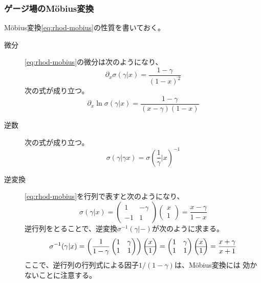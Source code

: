 \subsubsection{ゲージ場のM\"obius変換}\label{s3:ゲージ場のMobius変換} %
M\"obius変換\eqref{eq:rhod-mobius}の性質を書いておく。
\begin{description} %
	\item[微分]	\eqref{eq:rhod-mobius}の微分は次のようになり、
	\begin{equation*}
		\partial_x\sigma(\gamma|x) = \frac{1 - \gamma}{(1 - x)^2}
	\end{equation*}
	次の式が成り立つ。
	\begin{equation}\label{eq:rhod-mobius-diff}
		\partial_x\ln\sigma(\gamma|x) = \frac{1 - \gamma}{(x - \gamma)(1 - x)}
	\end{equation}
	\item[逆数] 次の式が成り立つ。
	\begin{equation}\label{eq:rhod-mobius-rec}
		\sigma(\gamma|\gamma x) = \sigma(\frac{1}{\gamma}|x)^{-1}
	\end{equation}
	\item[逆変換] \eqref{eq:rhod-mobius}を行列で表すと次のようになり、
	\begin{equation*}
		\sigma(\gamma|x) = \begin{pmatrix}
			1 & -\gamma \\ -1 & 1
		\end{pmatrix}\begin{pmatrix}
			x \\\hline 1
		\end{pmatrix} = \frac{x - \gamma}{1 - x}
	\end{equation*}
	逆行列をとることで、逆変換$\sigma^{-1}(\gamma|-)$が次のように求まる。
	\begin{equation*}
		\sigma^{-1}(\gamma|x) = \mathinner{\left({\frac{1}{1 - \gamma}\begin{pmatrix}
			1 & \gamma \\ 1 & 1
		\end{pmatrix}}\right)}\begin{pmatrix}
			x \\\hline 1
		\end{pmatrix} = \begin{pmatrix}
			1 & \gamma \\ 1 & 1
		\end{pmatrix}\begin{pmatrix}
			x \\\hline 1
		\end{pmatrix} = \frac{x + \gamma}{x + 1}
	\end{equation*}
	ここで、逆行列の行列式による因子$1 / (1 - \gamma)$は、M\"obius変換には
	効かないことに注意する。
\end{description} %
